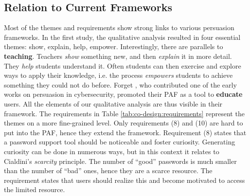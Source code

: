\subsection{Relation to Current Frameworks}
Most of the themes and requirements show strong links to various persuasion frameworks. In the first study, the qualitative analysis resulted in four essential themes: show, explain, help, empower. Interestingly, there are parallels to \textbf{teaching}. Teachers \textit{show} something new, and then \textit{explain} it in more detail. They \textit{help} students understand it. Often students can then exercise and explore ways to apply their knowledge, i.e. the process \textit{empowers} students to achieve something they could not do before. Forget \etal, who contributed one of the early works on persuasion in cybersecurity, promoted their \acrlong{PAF} as a tool to \textbf{educate} users. All the elements of our qualitative analysis are thus visible in their framework. The requirements in Table \ref{tab:co-design:requirements} represent the themes on a more fine-grained level. Only requirements (8) and (10) are hard to put into the PAF, hence they extend the framework.  
Requirement (8) states that a password support tool should be noticeable and foster curiosity. Generating curiosity can be done in numerous ways, but in this context it relates to Cialdini's \textit{scarcity} principle. The number of ``good'' passwords is much smaller than the number of ``bad'' ones, hence they are a scarce resource. The requirement states that users should realize this and become motivated to access the limited resource. %

